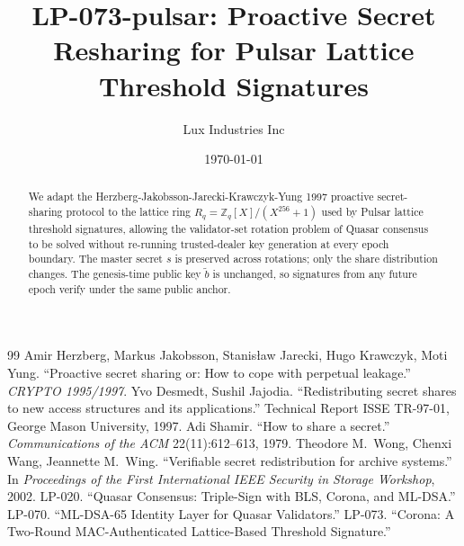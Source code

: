 \documentclass[11pt,a4paper]{article}
\title{LP-073-pulsar: Proactive Secret Resharing for Pulsar Lattice Threshold Signatures}
\author{Lux Industries Inc}
\date{\today}
\begin{document}
\maketitle

\begin{abstract}
We adapt the Herzberg-Jakobsson-Jarecki-Krawczyk-Yung 1997 proactive
secret-sharing protocol to the lattice ring $R_q = \mathbb{Z}_q[X]/(X^{256}+1)$
used by Pulsar lattice threshold signatures, allowing the validator-set
rotation problem of Quasar consensus to be solved without re-running
trusted-dealer key generation at every epoch boundary. The master secret
$s$ is preserved across rotations; only the share distribution changes.
The genesis-time public key $\tilde b$ is unchanged, so signatures from
any future epoch verify under the same public anchor.
\end{abstract}



\begin{thebibliography}{99}
Amir Herzberg, Markus Jakobsson, Stanis\l{}aw Jarecki, Hugo Krawczyk, Moti Yung.
``Proactive secret sharing or: How to cope with perpetual leakage.''
\emph{CRYPTO 1995/1997}.
Yvo Desmedt, Sushil Jajodia.
``Redistributing secret shares to new access structures and its applications.''
Technical Report ISSE TR-97-01, George Mason University, 1997.
Adi Shamir.
``How to share a secret.''
\emph{Communications of the ACM} 22(11):612--613, 1979.
Theodore M.\ Wong, Chenxi Wang, Jeannette M.\ Wing.
``Verifiable secret redistribution for archive systems.''
In \emph{Proceedings of the First International IEEE Security in Storage Workshop}, 2002.
LP-020. ``Quasar Consensus: Triple-Sign with BLS, Corona, and ML-DSA.''
LP-070. ``ML-DSA-65 Identity Layer for Quasar Validators.''
LP-073. ``Corona: A Two-Round MAC-Authenticated Lattice-Based Threshold Signature.''
\end{thebibliography}
\end{document}
